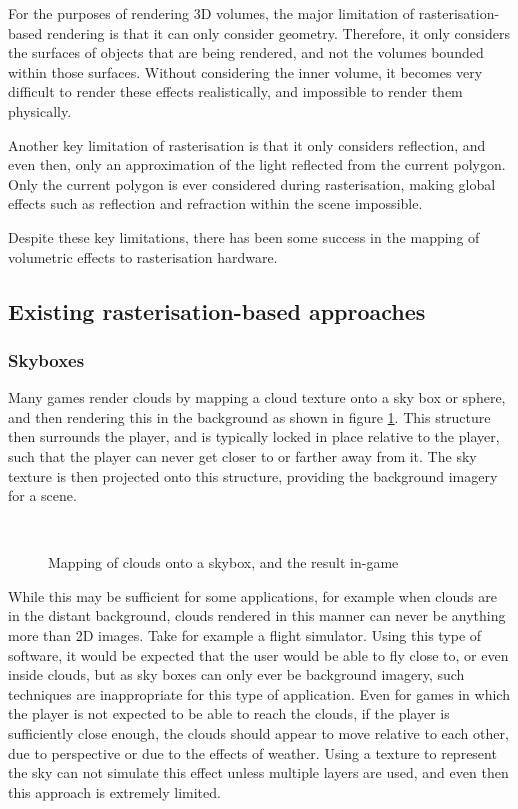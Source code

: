 For the purposes of rendering 3D volumes, the major limitation of rasterisation-based rendering is that it can only consider geometry. Therefore, it only considers the surfaces of objects that are being rendered, and not the volumes bounded within those surfaces. Without considering the inner volume, it becomes very difficult to render these effects realistically, and impossible to render them physically.

Another key limitation of rasterisation is that it only considers reflection, and even then, only an approximation of the light reflected from the current polygon. Only the current polygon is ever considered during rasterisation, making global effects such as reflection and refraction within the scene impossible.

Despite these key limitations, there has been some success in the mapping of volumetric effects to rasterisation hardware.

\subsection{Existing rasterisation-based approaches}

\subsubsection{Skyboxes}
Many games render clouds by mapping a cloud texture onto a sky box or sphere, and then rendering this in the background as shown in figure \ref{fig:skybox}. This structure then surrounds the player, and is typically locked in place relative to the player, such that the player can never get closer to or farther away from it. The sky texture is then projected onto this structure, providing the background imagery for a scene.

\begin{figure}
\centering
	\centering
	~

	\caption{Mapping of clouds onto a skybox, and the result in-game}
	\label{fig:skybox}
\end{figure}

While this may be sufficient for some applications, for example when clouds are in the distant background, clouds rendered in this manner can never be anything more than 2D images. Take for example a flight simulator. Using this type of software, it would be expected that the user would be able to fly close to, or even inside clouds, but as sky boxes can only ever be background imagery, such techniques are inappropriate for this type of application. Even for games in which the player is not expected to be able to reach the clouds, if the player is sufficiently close enough, the clouds should appear to move relative to each other, due to perspective or due to the effects of weather. Using a texture to represent the sky can not simulate this effect unless multiple layers are used, and even then this approach is extremely limited.

